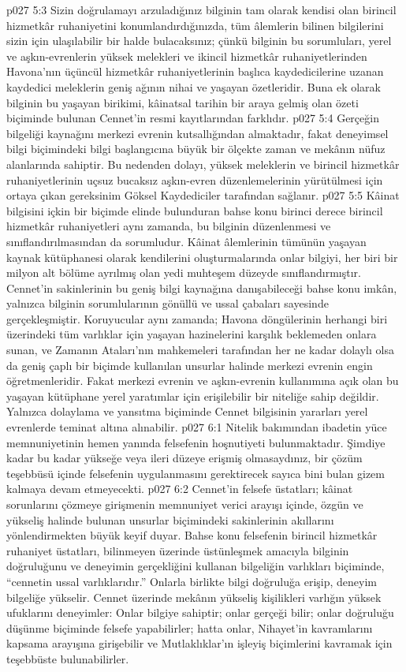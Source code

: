 \vs p027 5:3 Sizin doğrulamayı arzuladığınız bilginin tam olarak kendisi olan birincil hizmetkâr ruhaniyetini konumlandırdığınızda, tüm âlemlerin  bilinen bilgilerini sizin için ulaşılabilir bir halde bulacaksınız; çünkü bilginin bu sorumluları, yerel ve aşkın\hyp{}evrenlerin yüksek melekleri ve ikincil hizmetkâr ruhaniyetlerinden Havona’nın üçüncül hizmetkâr ruhaniyetlerinin başlıca kaydedicilerine uzanan kaydedici meleklerin geniş ağının nihai ve yaşayan özetleridir. Buna ek olarak bilginin bu yaşayan birikimi, kâinatsal tarihin bir araya gelmiş olan özeti biçiminde bulunan Cennet’in resmi kayıtlarından farklıdır.
\vs p027 5:4 Gerçeğin bilgeliği kaynağını merkezi evrenin kutsallığından almaktadır, fakat deneyimsel bilgi biçimindeki bilgi başlangıcına büyük bir ölçekte zaman ve mekânın nüfuz alanlarında sahiptir. Bu nedenden dolayı, yüksek meleklerin ve birincil hizmetkâr ruhaniyetlerinin uçsuz bucaksız aşkın\hyp{}evren düzenlemelerinin yürütülmesi için ortaya çıkan gereksinim Göksel Kaydediciler tarafından sağlanır.
\vs p027 5:5 Kâinat bilgisini içkin bir biçimde elinde bulunduran bahse konu birinci derece birincil hizmetkâr ruhaniyetleri aynı zamanda, bu bilginin düzenlenmesi ve sınıflandırılmasından da sorumludur. Kâinat âlemlerinin tümünün yaşayan kaynak kütüphanesi olarak kendilerini oluşturmalarında onlar bilgiyi, her biri bir milyon alt bölüme ayrılmış olan yedi muhteşem düzeyde sınıflandırmıştır. Cennet’in sakinlerinin bu geniş bilgi kaynağına danışabileceği bahse konu imkân, yalnızca bilginin sorumlularının gönüllü ve ussal çabaları sayesinde gerçekleşmiştir. Koruyucular aynı zamanda; Havona döngülerinin herhangi biri üzerindeki tüm varlıklar için yaşayan hazinelerini karşılık beklemeden onlara sunan, ve Zamanın Ataları’nın mahkemeleri tarafından her ne kadar dolaylı olsa da geniş çaplı bir biçimde kullanılan unsurlar halinde merkezi evrenin engin öğretmenleridir. Fakat merkezi evrenin ve aşkın\hyp{}evrenin kullanımına açık olan bu yaşayan kütüphane yerel yaratımlar için erişilebilir bir niteliğe sahip değildir. Yalnızca dolaylama ve yansıtma biçiminde Cennet bilgisinin yararları yerel evrenlerde teminat altına alınabilir.
\vs p027 6:1 Nitelik bakımından ibadetin yüce memnuniyetinin hemen yanında felsefenin hoşnutiyeti bulunmaktadır. Şimdiye kadar bu kadar yükseğe veya ileri düzeye erişmiş olmasaydınız, bir çözüm teşebbüsü içinde felsefenin uygulanmasını gerektirecek sayıca bini bulan gizem kalmaya devam etmeyecekti.
\vs p027 6:2 Cennet’in felsefe üstatları; kâinat sorunlarını çözmeye girişmenin memnuniyet verici arayışı içinde, özgün ve yükseliş halinde bulunan unsurlar biçimindeki sakinlerinin akıllarını yönlendirmekten büyük keyif duyar. Bahse konu felsefenin birincil hizmetkâr ruhaniyet üstatları, bilinmeyen üzerinde üstünleşmek amacıyla bilginin doğruluğunu ve deneyimin gerçekliğini kullanan bilgeliğin varlıkları biçiminde, “cennetin ussal varlıklarıdır.” Onlarla birlikte bilgi doğruluğa erişip, deneyim bilgeliğe yükselir. Cennet üzerinde mekânın yükseliş kişilikleri varlığın yüksek ufuklarını deneyimler: Onlar bilgiye sahiptir; onlar gerçeği bilir; onlar doğruluğu düşünme biçiminde felsefe yapabilirler; hatta onlar, Nihayet’in kavramlarını kapsama arayışına girişebilir ve Mutlaklıklar’ın işleyiş biçimlerini kavramak için teşebbüste bulunabilirler.
